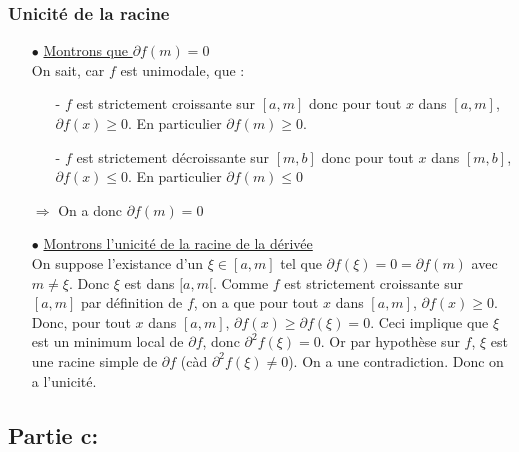 \documentclass[a4paper, 12pt]{article}
\begin{document}
\subsubsection{Unicité de la racine}

\begin{itemize}
	\item[$\bullet$] \underline{Montrons que $\partial f(m) =0 $} \\
		On sait, car $f$ est unimodale, que :
		\begin{itemize}
			\item[-] $f$ est strictement croissante sur $[a,m]$ donc pour tout $x$ dans $[a,m]$, $\partial f(x) \geqslant 0$. En particulier $\partial f(m) \geqslant 0$.
			\item[-] $f$ est strictement décroissante sur $[m,b]$ donc pour tout $x$ dans $[m,b]$, $\partial f(x) \leqslant 0 $. En particulier $\partial f(m) \leqslant 0$
		\end{itemize}
		$\Rightarrow$ On a donc $\partial f(m) = 0$
	\item[$\bullet$] \underline{Montrons l'unicité de la racine de la dérivée} \\
		On suppose l'existance d'un $\xi \in [a,m]$ tel que $ \partial f(\xi) = 0 = \partial f(m)$ avec $ m \neq \xi$. Donc $\xi$ est dans $[a,m[$. Comme $f$ est strictement croissante sur $[a,m]$ par définition de $f$, on a que pour tout $x$ dans $[a,m]$, $\partial f(x) \geqslant 0$. Donc, pour tout $x$ dans $[a,m]$, $\partial f(x) \geqslant \partial f(\xi) = 0$. Ceci implique que $\xi$ est un minimum local de $\partial f$, donc $\partial^2 f(\xi) = 0$. Or par hypothèse sur $f$, $\xi$ est une racine simple de $\partial f$ (càd $\partial^2 f(\xi) \neq 0$). On a une contradiction. Donc on a l'unicité.
\end{itemize}


\newpage
\subsection{Partie c:}
\end{document}

